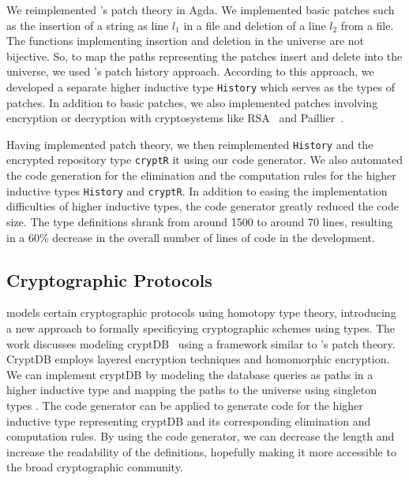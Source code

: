\documentclass[sigplan,10pt]{acmart}
\begin{document}
We reimplemented \citeauthor{Angiuli-2014}'s patch theory in Agda.
We implemented basic patches such as the insertion of a string as line $l_1$ in a file and deletion of a line $l_2$ from a file. The functions implementing insertion and deletion in the universe are not bijective. So, to map the paths representing the patches insert and delete into the universe, we used \citeauthor{Angiuli-2014}'s patch history approach. According to this approach, we developed a separate higher inductive type \texttt{History} which serves as the types of patches. In addition to basic patches, we also implemented patches involving encryption or decryption with cryptosystems like RSA~\cite{Rivest-1978} and Paillier~\cite{Paillier-1999}.

Having implemented patch theory, we then reimplemented \texttt{History} and the encrypted repository type \texttt{cryptR}  it using our code generator. We also automated the code generation for the elimination and the computation rules for the higher inductive types \texttt{History} and \texttt{cryptR}. In addition to easing the implementation difficulties of higher inductive types, the code generator greatly reduced the code size. The type definitions shrank from around 1500 to around 70 lines, resulting in a 60\% decrease in the overall number of lines of code in the development.

\subsection{Cryptographic Protocols}
\label{crypto}

\citet{Paventhan-2018} models certain cryptographic protocols using homotopy type theory,  introducing a new approach to formally specificying cryptographic schemes using types. The work discusses modeling cryptDB~\citep{Popa-2011} using a framework similar to \citeauthor{Angiuli-2014}'s patch theory. CryptDB employs layered encryption techniques and homomorphic encryption. We can implement cryptDB by modeling the database queries as paths in a higher inductive type and mapping the paths to the universe using singleton types \cite{Angiuli-2014}. The code generator can be applied to generate code for the higher inductive type representing cryptDB and its corresponding elimination and computation rules. By using the code generator, we can decrease the length and increase the readability of the definitions, hopefully making it more accessible to the broad cryptographic community.

\end{document}
